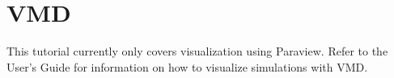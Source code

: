 \section{\label{sec:vmd}VMD}

This tutorial currently only covers visualization using Paraview. Refer to the User's Guide for information on how to visualize \ES{} simulations with VMD.

\pagebreak
